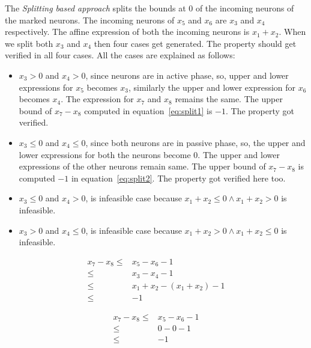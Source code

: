 The {\em Splitting based approach} splits the bounds at $0$ of the incoming neurons of the marked neurons. 
The incoming neurons of $x_5$ and $x_6$ are $x_3$ and $x_4$ respectively. 
The affine expression of both the incoming neurons is $x_1+x_2$. 
When we split both $x_3$ and $x_4$ then four cases get generated. The property should get verified in all four cases. 
All the cases are explained as follows: 
\begin{itemize}
    \item $x_3 > 0$ and $x_4 > 0$, since neurons are in active phase, so, upper and lower expressions for $x_5$ 
    becomes $x_3$, similarly the upper and lower expression for $x_6$ becomes $x_4$. 
    The expression for $x_7$ and $x_8$ remains the same. The upper bound of $x_7 - x_8$ computed in equation~\ref{eq:split1} is $-1$. 
    The property got verified.   
    \item $x_3 \leq 0$ and $x_4 \leq 0$, since both neurons are in passive phase, so, the upper and lower expressions 
        for both the neurons become $0$. The upper and lower expressions of the other neurons remain same. 
        The upper bound of $x_7 - x_8$ is computed $-1$ in equation~\ref{eq:split2}. The property got verified here too. 
    \item $x_3 \leq 0$ and $x_4 > 0$, is infeasible case because $x_1+x_2 \leq 0 \land x_1 + x_2 > 0$ is infeasible. 
    \item $x_3 > 0$ and $x_4 \leq 0$, is infeasible case because $x_1+x_2 > 0 \land x_1 + x_2 \leq 0$ is infeasible. 
\end{itemize}

\begin{equation}
    \begin{aligned}
        x_7 - x_8 \leq & x_5 - x_6 - 1 \\
       \leq & x_3 - x_4 -1 \\
       \leq & x_1 + x_2 -(x_1+x_2) -1 \\
       \leq & -1 
    \end{aligned}
    \label{eq:split1}
\end{equation}

\begin{equation}
    \begin{aligned}
      x_7 - x_8 \leq & x_5 - x_6 - 1 \\
        \leq & 0 - 0 - 1 \\
        \leq & -1
    \end{aligned}
    \label{eq:split2}
\end{equation}


